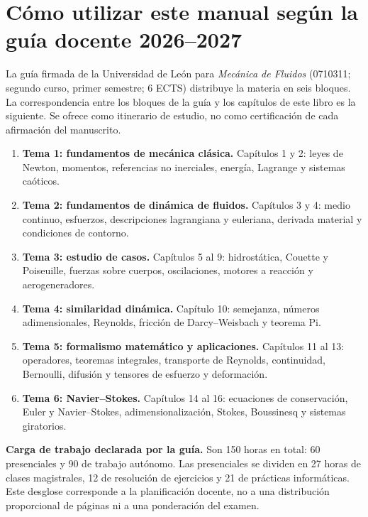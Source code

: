 \section*{Cómo utilizar este manual según la guía docente 2026--2027}
La guía firmada de la Universidad de León para \emph{Mecánica de Fluidos}
(0710311; segundo curso, primer semestre; 6 ECTS) distribuye la materia
en seis bloques. La correspondencia entre los bloques de la guía y
los capítulos de este libro es la siguiente. Se ofrece como itinerario
de estudio, no como certificación de cada afirmación del manuscrito.

\begin{enumerate}
\item \textbf{Tema 1: fundamentos de mecánica clásica.} Capítulos 1 y 2:
leyes de Newton, momentos, referencias no inerciales, energía,
Lagrange y sistemas caóticos.
\item \textbf{Tema 2: fundamentos de dinámica de fluidos.} Capítulos 3 y 4:
medio continuo, esfuerzos, descripciones lagrangiana y euleriana,
derivada material y condiciones de contorno.
\item \textbf{Tema 3: estudio de casos.} Capítulos 5 al 9:
hidrostática, Couette y Poiseuille, fuerzas sobre cuerpos,
oscilaciones, motores a reacción y aerogeneradores.
\item \textbf{Tema 4: similaridad dinámica.} Capítulo 10:
semejanza, números adimensionales, Reynolds, fricción de
Darcy--Weisbach y teorema Pi.
\item \textbf{Tema 5: formalismo matemático y aplicaciones.} Capítulos
11 al 13: operadores, teoremas integrales, transporte de Reynolds,
continuidad, Bernoulli, difusión y tensores de esfuerzo y deformación.
\item \textbf{Tema 6: Navier--Stokes.} Capítulos 14 al 16:
ecuaciones de conservación, Euler y Navier--Stokes,
adimensionalización, Stokes, Boussinesq y sistemas giratorios.
\end{enumerate}

\noindent\textbf{Carga de trabajo declarada por la guía.}
Son 150 horas en total: 60 presenciales y 90 de trabajo autónomo.
Las presenciales se dividen en 27 horas de clases magistrales,
12 de resolución de ejercicios y 21 de prácticas informáticas.
Este desglose corresponde a la planificación docente, no a una
distribución proporcional de páginas ni a una ponderación del examen.

